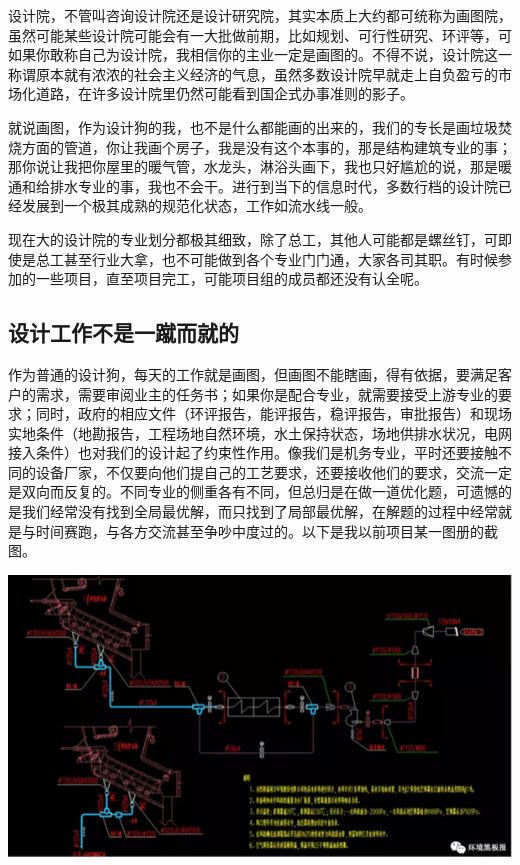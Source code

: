 \documentclass[]{book}
\begin{document}
设计院，不管叫咨询设计院还是设计研究院，其实本质上大约都可统称为画图院，虽然可能某些设计院可能会有一大批做前期，比如规划、可行性研究、环评等，可如果你敢称自己为设计院，我相信你的主业一定是画图的。不得不说，设计院这一称谓原本就有浓浓的社会主义经济的气息，虽然多数设计院早就走上自负盈亏的市场化道路，在许多设计院里仍然可能看到国企式办事准则的影子。

就说画图，作为设计狗的我，也不是什么都能画的出来的，我们的专长是画垃圾焚烧方面的管道，你让我画个房子，我是没有这个本事的，那是结构建筑专业的事；那你说让我把你屋里的暖气管，水龙头，淋浴头画下，我也只好尴尬的说，那是暖通和给排水专业的事，我也不会干。进行到当下的信息时代，多数行档的设计院已经发展到一个极其成熟的规范化状态，工作如流水线一般。

现在大的设计院的专业划分都极其细致，除了总工，其他人可能都是螺丝钉，可即使是总工甚至行业大拿，也不可能做到各个专业门门通，大家各司其职。有时候参加的一些项目，直至项目完工，可能项目组的成员都还没有认全呢。

\hypertarget{ux8bbeux8ba1ux5de5ux4f5cux4e0dux662fux4e00ux8e74ux800cux5c31ux7684}{%
\subsection{设计工作不是一蹴而就的}\label{ux8bbeux8ba1ux5de5ux4f5cux4e0dux662fux4e00ux8e74ux800cux5c31ux7684}}

作为普通的设计狗，每天的工作就是画图，但画图不能瞎画，得有依据，要满足客户的需求，需要审阅业主的任务书；如果你是配合专业，就需要接受上游专业的要求；同时，政府的相应文件（环评报告，能评报告，稳评报告，审批报告）和现场实地条件（地勘报告，工程场地自然环境，水土保持状态，场地供排水状况，电网接入条件）也对我们的设计起了约束性作用。像我们是机务专业，平时还要接触不同的设备厂家，不仅要向他们提自己的工艺要求，还要接收他们的要求，交流一定是双向而反复的。不同专业的侧重各有不同，但总归是在做一道优化题，可遗憾的是我们经常没有找到全局最优解，而只找到了局部最优解，在解题的过程中经常就是与时间赛跑，与各方交流甚至争吵中度过的。以下是我以前项目某一图册的截图。

\includegraphics[width=8.33in]{images/sisi2}
\end{document}
